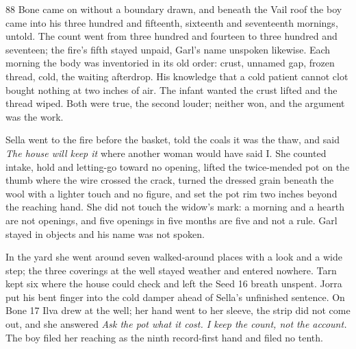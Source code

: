 
\scenebreak


\scenebreak


\scenebreak

\CRtailpiece
\begin{CRchronicle}{88}
Bone came on without a boundary drawn, and beneath the Vail roof the boy came into his three hundred and fifteenth, sixteenth and seventeenth mornings, untold. The count went from three hundred and fourteen to three hundred and seventeen; the fire’s fifth stayed unpaid, Garl’s name unspoken likewise. Each morning the body was inventoried in its old order: crust, unnamed gap, frozen thread, cold, the waiting afterdrop. His knowledge that a cold patient cannot clot bought nothing at two inches of air. The infant wanted the crust lifted and the thread wiped. Both were true, the second louder; neither won, and the argument was the work.

Sella went to the fire before the basket, told the coals it was the thaw, and said \emph{The house will keep it} where another woman would have said I. She counted intake, hold and letting-go toward no opening, lifted the twice-mended pot on the thumb where the wire crossed the crack, turned the dressed grain beneath the wool with a lighter touch and no figure, and set the pot rim two inches beyond the reaching hand. She did not touch the widow’s mark: a morning and a hearth are not openings, and five openings in five months are five and not a rule. Garl stayed in objects and his name was not spoken.

In the yard she went around seven walked-around places with a look and a wide step; the three coverings at the well stayed weather and entered nowhere. Tarn kept six where the house could check and left the Seed 16 breath unspent. Jorra put his bent finger into the cold damper ahead of Sella’s unfinished sentence. On Bone 17 Ilva drew at the well; her hand went to her sleeve, the strip did not come out, and she answered \emph{Ask the pot what it cost. I keep the count, not the account.} The boy filed her reaching as the ninth record-first hand and filed no tenth.


\end{CRchronicle}
